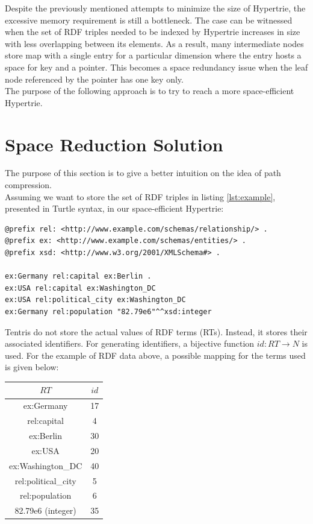 Despite the previously mentioned attempts to minimize the size of Hypertrie, the excessive memory requirement is still a bottleneck. The case can be witnessed when the set of RDF triples needed to be indexed by Hypertrie increases in size with less overlapping between its elements. As a result, many intermediate nodes store map with a single entry for a particular dimension where the entry hosts a space for key and a pointer. This becomes a space redundancy issue when the leaf node referenced by the pointer has one key only. \\ 

The purpose of the following approach is to try to reach a more space-efficient Hypertrie.

\section{Space Reduction Solution}

The purpose of this section is to give a better intuition on the idea of path compression.  \\

Assuming we want to store the set of RDF triples in listing \ref{lst:example}, presented in Turtle syntax, in our space-efficient Hypertrie: 

\begin{lstlisting}[caption={An example set of RDF triples},label={lst:example}]
@prefix rel: <http://www.example.com/schemas/relationship/> .
@prefix ex: <http://www.example.com/schemas/entities/> .
@prefix xsd: <http://www.w3.org/2001/XMLSchema#> .

ex:Germany rel:capital ex:Berlin .
ex:USA rel:capital ex:Washington_DC
ex:USA rel:political_city ex:Washington_DC
ex:Germany rel:population "82.79e6"^^xsd:integer	
\end{lstlisting}

Tentris do not store the actual values of RDF terms (RTs). Instead, it stores their associated identifiers. 
For generating identifiers, a bijective function $id: RT \to N$ is used. 
For the example of RDF data above, a possible mapping for the terms used is given below: \\

\begin{center}
	\begin{tabular}{ |c|c| } 
		\hline
		$RT$ & $id$ \\
		\hline
		ex:Germany & 17 \\ 
		rel:capital & 4 \\ 
		ex:Berlin & 30 \\ 
		ex:USA & 20 \\
		ex:Washington\_DC & 40 \\
		rel:political\_city & 5 \\
		rel:population & 6 \\
		82.79e6 (integer) & 35 \\
		\hline
	\end{tabular}
\end{center}

